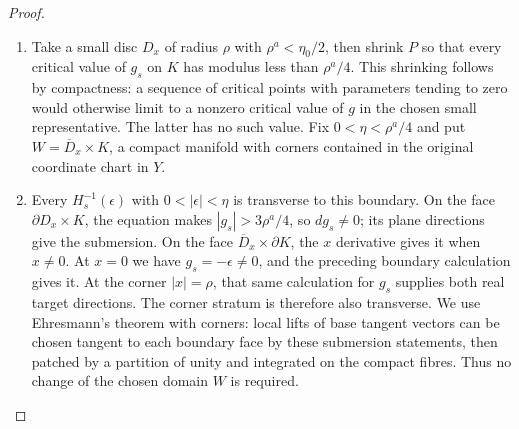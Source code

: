 \begin{proof}
\begin{enumerate}[label={$\langle1\rangle$\arabic*.},leftmargin=*]
\item Take a small disc $D_x$ of radius $\rho$ with
$\rho^a<\eta_0/2$, then shrink $P$ so that every
critical value of $g_s$ on $K$ has modulus less than
$\rho^a/4$. This shrinking follows by compactness:
a sequence of critical points with parameters
tending to zero would otherwise limit to a
nonzero critical value of $g$ in the chosen small
representative. The latter has no such value.
Fix $0<\eta<\rho^a/4$ and put
$W=\overline D_x\times K$, a compact manifold
with corners contained in the original coordinate
chart in $Y$.

\item Every $H_s^{-1}(\epsilon)$ with
$0<|\epsilon|<\eta$ is transverse to this boundary.
On the face $\partial D_x\times K$, the equation
makes $|g_s|>3\rho^a/4$, so $dg_s\ne0$; its plane
directions give the submersion. On the face
$\overline D_x\times\partial K$, the $x$
derivative gives it when $x\ne0$. At $x=0$ we
have $g_s=-\epsilon\ne0$, and the preceding
boundary calculation gives it. At the corner
$|x|=\rho$, that same calculation for $g_s$
supplies both real target directions. The corner
stratum is therefore also transverse. We use
Ehresmann's theorem with corners: local lifts of
base tangent vectors can be chosen tangent to
each boundary face by these submersion statements,
then patched by a partition of unity and
integrated on the compact fibres. Thus no change
of the chosen domain $W$ is required.


\end{enumerate}
\end{proof}
